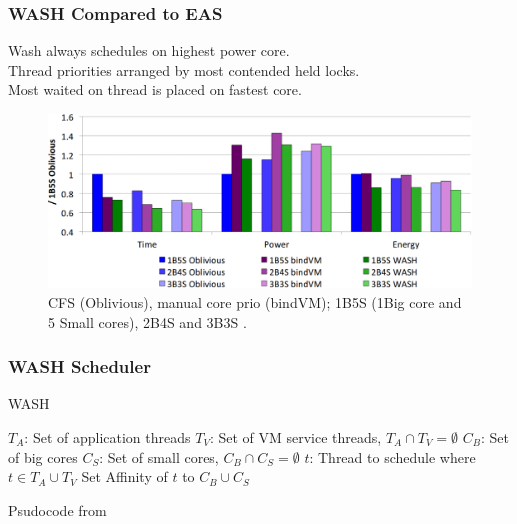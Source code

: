 \documentclass{beamer}
\begin{document}
	\begin{frame}
		\frametitle{WASH Compared to EAS}
		Wash always schedules on highest power core.\\
		Thread priorities arranged by most contended held locks.\\
		Most waited on thread is placed on fastest core.\\
		\begin{figure}[h]
			\includegraphics[width=\textwidth]{images/WASH_benchmarks.jpg}
			\caption{CFS (Oblivious), manual core prio (bindVM); 1B5S (1Big core and 5 Small cores), 2B4S and 3B3S \cite{Jibaja:2016:PPA:2854038.2854047}.}
			\label{fig:WASH_benchmarks}
		\end{figure}
	\end{frame}
	
	\begin{frame}
		\frametitle{WASH Scheduler}
		\vspace*{-2.5mm}
		\begin{algorithm}[H]
		\caption{WASH}\label{euclid}
		\begin{algorithmic}
				\State $T_A$: Set of application threads
				\State $T_V$: Set of VM service threads, $T_A \cap T_V = \emptyset$
				\State $C_B$: Set of big cores
				\State $C_S$: Set of small cores, $C_B \cap C_S = \emptyset$
				\State $t$: Thread to schedule where $t \in T_A \cup T_V$
					\EndIf
						\State Set Affinity of $t$ to $C_B \cup C_S$
					\EndIf
				\EndIf
			\EndFunction
		\end{algorithmic}
		\end{algorithm}
		\vspace*{-7mm}
		Psudocode from \cite{Jibaja:2016:PPA:2854038.2854047}
	\end{frame}
	
	\begin{frame}
		
		{}
	\end{frame}
\end{document}
